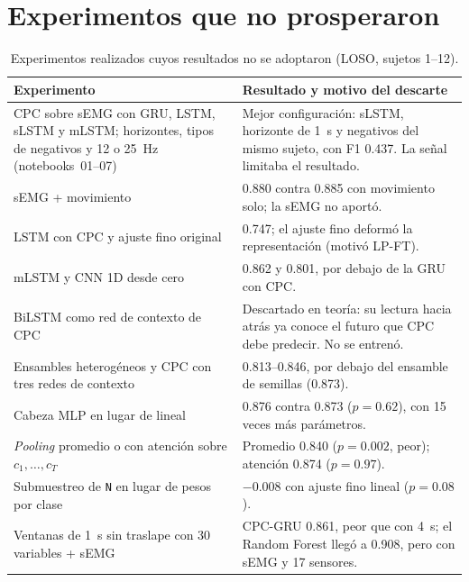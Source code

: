 \documentclass[letterpaper,11pt]{article}
\newcommand{\act}[1]{\texttt{#1}}
\begin{document}
\section{Experimentos que no prosperaron}
\label{anx:descartes}
\begin{table}[H]
  \centering
  \small
  \caption{Experimentos realizados cuyos resultados no se adoptaron (LOSO, sujetos 1--12).}
  \begin{tabular}{p{5.2cm}p{9.3cm}}
    \toprule
    Experimento & Resultado y motivo del descarte \\
    \midrule
    CPC sobre sEMG con GRU, LSTM, sLSTM y mLSTM; horizontes, tipos de negativos y 12 o 25~Hz (notebooks~01--07) & Mejor configuración: sLSTM, horizonte de 1~s y negativos del mismo sujeto, con F1 0.437. La señal limitaba el resultado. \\
    sEMG + movimiento & 0.880 contra 0.885 con movimiento solo; la sEMG no aportó. \\
    LSTM con CPC y ajuste fino original & 0.747; el ajuste fino deformó la representación (motivó LP-FT). \\
    mLSTM y CNN 1D desde cero & 0.862 y 0.801, por debajo de la GRU con CPC. \\
    BiLSTM como red de contexto de CPC & Descartado en teoría: su lectura hacia atrás ya conoce el futuro que CPC debe predecir. No se entrenó. \\
    Ensambles heterogéneos y CPC con tres redes de contexto & 0.813--0.846, por debajo del ensamble de semillas (0.873). \\
    Cabeza MLP en lugar de lineal & 0.876 contra 0.873 ($p = 0.62$), con 15 veces más parámetros. \\
    \emph{Pooling} promedio o con atención sobre $c_1,\dots,c_T$ & Promedio 0.840 ($p = 0.002$, peor); atención 0.874 ($p = 0.97$). \\
    Submuestreo de \act{N} en lugar de pesos por clase & $-0.008$ con ajuste fino lineal ($p = 0.08$). \\
    Ventanas de 1~s sin traslape con 30 variables + sEMG & CPC-GRU 0.861, peor que con 4~s; el Random Forest llegó a 0.908, pero con sEMG y 17 sensores. \\
    \bottomrule
  \end{tabular}
\end{table}
\end{document}
